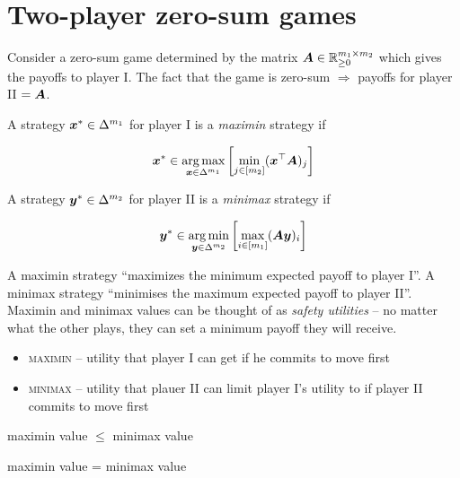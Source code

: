 \section{Two-player zero-sum games}

\label{sec:TPZSgames}

Consider a zero-sum game determined by the matrix $\bm{A} \in \mathbb{R}^{m_1
\times m_2}_{\ge 0}$ which gives the payoffs to player I.  The fact that the
game is zero-sum $\Rightarrow$ payoffs for player II $=\bm{A}$.

\begin{definition}[Maximin]
	A strategy $\bm{x}^* \in \Delta^{m_1}$ for player I is a \textit{maximin}
	strategy if

	\begin{equation}
		\bm{x}^* \in \operatorname*{arg\,max}_{\bm{x} \in \Delta^{m_1}} \left[
			\min_{j \in [m_2]} (\bm{x}^\top \bm{A})_j \right]
	\end{equation}
\end{definition}

\begin{definition}[Minimax]
	A strategy $\bm{y}^* \in \Delta^{m_2}$ for player II is a
	\textit{minimax} strategy if

	\begin{equation}
		\bm{y}^* \in \operatorname*{arg\,min}_{\bm{y} \in \Delta^{m_2}} \left[
			\max_{i \in [m_1]} (\bm{A} \bm{y})_i \right]
	\end{equation}
\end{definition}

A maximin strategy ``maximizes the minimum expected payoff to player I''. A
minimax strategy ``minimises the maximum expected payoff to player II''.
Maximin and minimax values can be thought of as \textit{safety utilities} -- no
matter what the other plays, they can set a minimum payoff they will receive.

\begin{itemize}
	\item \textsc{maximin} -- utility that player I can get if he commits to
		move first
	\item \textsc{minimax} -- utility that plauer II can limit player I's
		utility to if player II commits to move first
\end{itemize}

\begin{fact}
	maximin value $\le$ minimax value
\end{fact}

\begin{theorem}
	maximin value = minimax value
\end{theorem}

